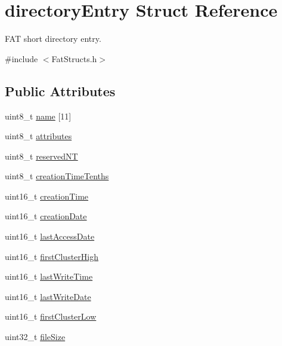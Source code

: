 \hypertarget{structdirectory_entry}{}\section{directory\+Entry Struct Reference}
\label{structdirectory_entry}


F\+AT short directory entry.  




{\ttfamily \#include $<$Fat\+Structs.\+h$>$}

\subsection*{Public Attributes}
\begin{DoxyCompactItemize}
\item 
uint8\+\_\+t \hyperlink{structdirectory_entry_a05dc993ea55a1a742de5970541a31ecb}{name} \mbox{[}11\mbox{]}
\item 
uint8\+\_\+t \hyperlink{structdirectory_entry_a16c6cde55c8175c90935c386f1cfb21a}{attributes}
\item 
uint8\+\_\+t \hyperlink{structdirectory_entry_afe7d00be85f3b78549b21610050da52b}{reserved\+NT}
\item 
uint8\+\_\+t \hyperlink{structdirectory_entry_aa5e1ce5b411b88f005b28a3e7c7c5af6}{creation\+Time\+Tenths}
\item 
uint16\+\_\+t \hyperlink{structdirectory_entry_a622bfa70c2cd9006108d7473d737a953}{creation\+Time}
\item 
uint16\+\_\+t \hyperlink{structdirectory_entry_a7b43372794655fe6604d3c17c02302fe}{creation\+Date}
\item 
uint16\+\_\+t \hyperlink{structdirectory_entry_abca70dc5c5fcbe199fd78df010111331}{last\+Access\+Date}
\item 
uint16\+\_\+t \hyperlink{structdirectory_entry_a3b492598b2b05e8425d2a500443613bd}{first\+Cluster\+High}
\item 
uint16\+\_\+t \hyperlink{structdirectory_entry_a7bab435322d1928f66fbce53ee1f402d}{last\+Write\+Time}
\item 
uint16\+\_\+t \hyperlink{structdirectory_entry_a12b2e7cf87482a942a0b5d3df6c51468}{last\+Write\+Date}
\item 
uint16\+\_\+t \hyperlink{structdirectory_entry_a74bd660417a9c3501eae353326c14bb9}{first\+Cluster\+Low}
\item 
uint32\+\_\+t \hyperlink{structdirectory_entry_ac2445d99b50f925f662952e0ccd26a02}{file\+Size}
\end{DoxyCompactItemize}



